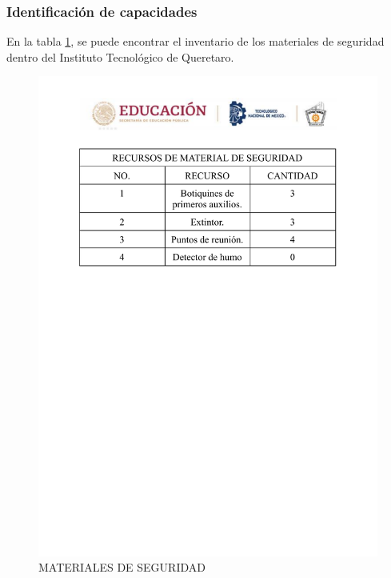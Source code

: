     \subsubsection{Identificación de capacidades}
    En la tabla \ref{Material de seguridad.}, se puede encontrar el inventario de los materiales de seguridad dentro del Instituto Tecnológico de Queretaro. 
    \begin{figure}
        \centering
    \includegraphics[trim = {0mm 150mm 0mm 0mm},clip,scale=0.3]{24/Img/materialdeSeguridad.pdf}
        \caption{MATERIALES DE SEGURIDAD}
        \label{Material de seguridad.}
    \end{figure}
